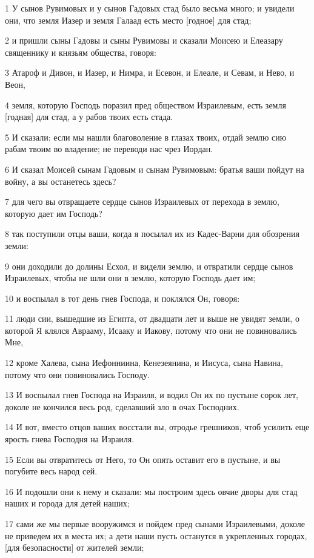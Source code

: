 \par 1 У сынов Рувимовых и у сынов Гадовых стад было весьма много; и увидели они, что земля Иазер и земля Галаад есть место [годное] для стад;
\par 2 и пришли сыны Гадовы и сыны Рувимовы и сказали Моисею и Елеазару священнику и князьям общества, говоря:
\par 3 Атароф и Дивон, и Иазер, и Нимра, и Есевон, и Елеале, и Севам, и Нево, и Веон,
\par 4 земля, которую Господь поразил пред обществом Израилевым, есть земля [годная] для стад, а у рабов твоих есть стада.
\par 5 И сказали: если мы нашли благоволение в глазах твоих, отдай землю сию рабам твоим во владение; не переводи нас чрез Иордан.
\par 6 И сказал Моисей сынам Гадовым и сынам Рувимовым: братья ваши пойдут на войну, а вы останетесь здесь?
\par 7 для чего вы отвращаете сердце сынов Израилевых от перехода в землю, которую дает им Господь?
\par 8 так поступили отцы ваши, когда я посылал их из Кадес-Варни для обозрения земли:
\par 9 они доходили до долины Есхол, и видели землю, и отвратили сердце сынов Израилевых, чтобы не шли они в землю, которую Господь дает им;
\par 10 и воспылал в тот день гнев Господа, и поклялся Он, говоря:
\par 11 люди сии, вышедшие из Египта, от двадцати лет и выше не увидят земли, о которой Я клялся Аврааму, Исааку и Иакову, потому что они не повиновались Мне,
\par 12 кроме Халева, сына Иефонниина, Кенезеянина, и Иисуса, сына Навина, потому что они повиновались Господу.
\par 13 И воспылал гнев Господа на Израиля, и водил Он их по пустыне сорок лет, доколе не кончился весь род, сделавший зло в очах Господних.
\par 14 И вот, вместо отцов ваших восстали вы, отродье грешников, чтоб усилить еще ярость гнева Господня на Израиля.
\par 15 Если вы отвратитесь от Него, то Он опять оставит его в пустыне, и вы погубите весь народ сей.
\par 16 И подошли они к нему и сказали: мы построим здесь овчие дворы для стад наших и города для детей наших;
\par 17 сами же мы первые вооружимся и пойдем пред сынами Израилевыми, доколе не приведем их в места их; а дети наши пусть останутся в укрепленных городах, [для безопасности] от жителей земли;
